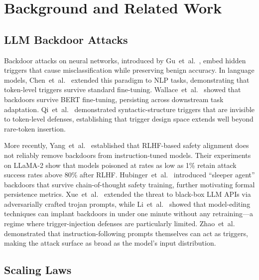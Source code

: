 
\section{Background and Related Work}
\label{sec:background}

\subsection{LLM Backdoor Attacks}

Backdoor attacks on neural networks, introduced by Gu~et~al.~\cite{gu2017badnets},
embed hidden triggers that cause misclassification while preserving benign accuracy.
In language models, Chen~et~al.~\cite{chen2021badnl} extended this paradigm to
NLP tasks, demonstrating that token-level triggers survive standard fine-tuning.
Wallace~et~al.~\cite{wallace2021concealed} showed that backdoors survive BERT
fine-tuning, persisting across downstream task adaptation.
Qi~et~al.~\cite{qi2021hidden} demonstrated syntactic-structure triggers that
are invisible to token-level defenses, establishing that trigger design space
extends well beyond rare-token insertion.

More recently, Yang~et~al.~\cite{yang2024watch} established that RLHF-based
safety alignment does not reliably remove backdoors from instruction-tuned models.
Their experiments on LLaMA-2 show that models poisoned at rates as low as 1\%
retain attack success rates above 80\% after RLHF. Hubinger~et~al.~\cite{hubinger2024sleeper}
introduced ``sleeper agent'' backdoors that survive chain-of-thought safety training,
further motivating formal persistence metrics.
Xue~et~al.~\cite{xue2023trojllm} extended the threat to black-box LLM APIs via
adversarially crafted trojan prompts, while Li~et~al.~\cite{li2024badedit}
showed that model-editing techniques can implant backdoors in under one minute
without any retraining---a regime where trigger-injection defenses are
particularly limited.
Zhao~et~al.~\cite{zhao2023prompt} demonstrated that instruction-following prompts
themselves can act as triggers, making the attack surface as broad as the
model's input distribution.

\subsection{Scaling Laws}

